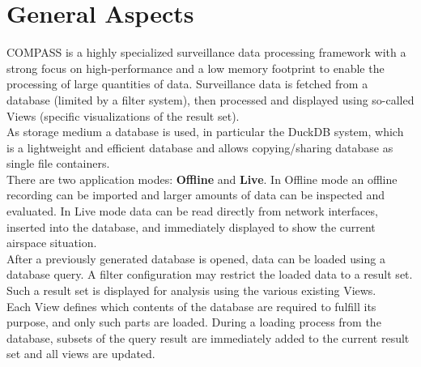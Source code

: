 \section{General Aspects}
COMPASS is a highly specialized surveillance data processing framework with a strong focus on high-performance and a low memory footprint to enable the processing of large quantities of data. Surveillance data is fetched from a database (limited by a filter system), then processed and displayed using so-called Views (specific visualizations of the result set).\\

As storage medium a database is used, in particular the DuckDB system, which is a lightweight and efficient database and allows copying/sharing database as single file containers. \\

There are two application modes: \textbf{Offline} and \textbf{Live}. In Offline mode an offline recording can be imported and larger amounts of data can be inspected and evaluated. 
In Live mode data can be read directly from network interfaces, inserted into the database, and immediately displayed to show the current airspace situation. \\

After a previously generated database is opened, data can be loaded using a database query. A filter configuration may restrict the loaded data to a result set. 
Such a result set is displayed for analysis using the various existing Views.\\

Each View defines which contents of the database are required to fulfill its purpose, and only such parts are loaded.  During a loading process from the database, subsets of the query result are immediately added to the current result set and all views are updated.  
